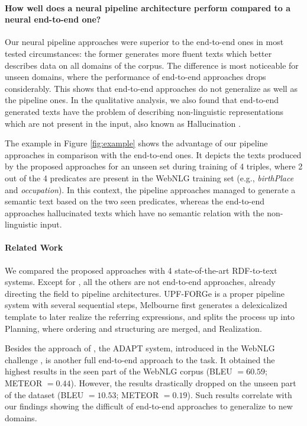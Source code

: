 \documentclass[11pt,a4paper]{article}
\begin{document}
\paragraph{How well does a neural pipeline architecture perform compared to a neural end-to-end one?} Our neural pipeline approaches were superior to the end-to-end ones in most tested circumstances: the former generates more fluent texts which better describes data on all domains of the corpus. The difference is most noticeable for unseen domains, where the performance of end-to-end approaches drops considerably. This shows that end-to-end approaches do not generalize as well as the pipeline ones. In the qualitative analysis, we also found that end-to-end generated texts have the problem of describing non-linguistic representations which are not present in the input, also known as Hallucination \cite{rohrbach2018}. 

The example in Figure \ref{fig:example} shows the advantage of our pipeline approaches in comparison with the end-to-end ones. It depicts the texts produced by the proposed approaches for an unseen set during training of 4 triples, where 2 out of the 4 predicates are present in the WebNLG training set (e.g., \textit{birthPlace} and \textit{occupation}). In this context, the pipeline approaches managed to generate a semantic text based on the two seen predicates, whereas the end-to-end approaches hallucinated texts which have no semantic relation with the non-linguistic input.

\paragraph{Related Work} We compared the proposed approaches with 4 state-of-the-art RDF-to-text systems. Except for \citet{marcheggiani2018}, all the others are not end-to-end approaches, already directing the field to pipeline architectures. UPF-FORGe is a proper pipeline system with several sequential steps, Melbourne first generates a delexicalized template to later realize the referring expressions, and \citet{amit2019} splits the process up into Planning, where ordering and structuring are merged, and Realization.

Besides the approach of \citet{marcheggiani2018}, the ADAPT system, introduced in the WebNLG challenge \cite{claire2017b}, is another full end-to-end approach to the task. It obtained the highest results in the seen part of the WebNLG corpus (BLEU $=60.59$; METEOR $=0.44$). However, the results drastically dropped on the unseen part of the dataset (BLEU $=10.53$; METEOR $=0.19$). Such results correlate with our findings showing the difficult of end-to-end approaches to generalize to new domains.
\end{document}
